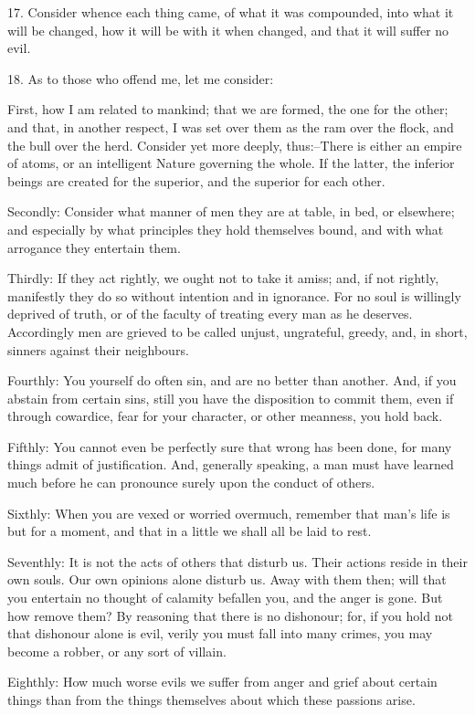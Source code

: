 \documentclass{book}
\begin{document}
17. Consider whence each thing came, of what it was compounded, into
what it will be changed, how it will be with it when changed, and that
it will suffer no evil.

18. As to those who offend me, let me consider:

First, how I am related to mankind; that we are formed, the one for
the other; and that, in another respect, I was set over them as the
ram over the flock, and the bull over the herd. Consider yet more
deeply, thus:--There is either an empire of atoms, or an intelligent
Nature governing the whole. If the latter, the inferior beings are
created for the superior, and the superior for each other.

Secondly: Consider what manner of men they are at table, in bed, or
elsewhere; and especially by what principles they hold themselves
bound, and with what arrogance they entertain them.

Thirdly: If they act rightly, we ought not to take it amiss; and, if
not rightly, manifestly they do so without intention and in
ignorance. For no soul is willingly deprived of truth, or of the
faculty of treating every man as he deserves. Accordingly men are
grieved to be called unjust, ungrateful, greedy, and, in short,
sinners against their neighbours.

Fourthly: You yourself do often sin, and are no better than
another. And, if you abstain from certain sins, still you have the
disposition to commit them, even if through cowardice, fear for your
character, or other meanness, you hold back.

Fifthly: You cannot even be perfectly sure that wrong has been done,
for many things admit of justification. And, generally speaking, a man
must have learned much before he can pronounce surely upon the conduct
of others.

Sixthly: When you are vexed or worried overmuch, remember that man's
life is but for a moment, and that in a little we shall all be laid to
rest.

Seventhly: It is not the acts of others that disturb us. Their actions
reside in their own souls. Our own opinions alone disturb us. Away
with them then; will that you entertain no thought of calamity
befallen you, and the anger is gone. But how remove them?  By
reasoning that there is no dishonour; for, if you hold not that
dishonour alone is evil, verily you must fall into many crimes, you
may become a robber, or any sort of villain.

Eighthly: How much worse evils we suffer from anger and grief about
certain things than from the things themselves about which these
passions arise.
\end{document}
